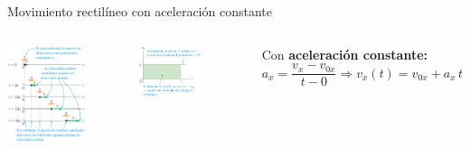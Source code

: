 \documentclass[9pt, aspectratio=169]{beamer}
\begin{document}
\begin{frame}{Movimiento rectilíneo con aceleración constante}
\begin{columns}
\cx
\begin{center}
    \includegraphics[width=0.7\textwidth]{figs/mrua-1.png}
\end{center}
\cx
\begin{center}
    \includegraphics[width=0.6\textwidth]{figs/mrua-2.png}
\end{center}

Con \textbf{aceleración constante:}
\begin{equation} 
    a_x = \frac{v_x - v_{0x}}{t - 0} \Rightarrow \boxed{v_x(t) = v_{0x} + a_x \, t} 
\label{eq:vt}
\end{equation}
\end{columns}
\end{frame}
\end{document}
